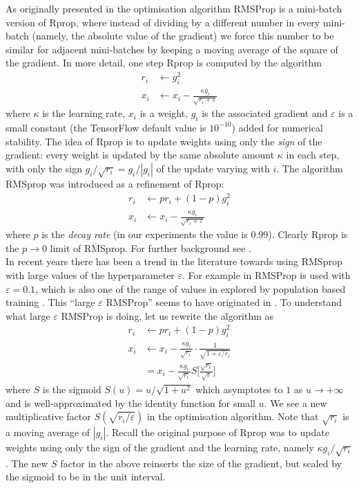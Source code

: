 \documentclass{article} %
\begin{document}
As originally presented in \citep{rmsprop} the optimisation algorithm RMSProp is a mini-batch version of Rprop, where instead of dividing by a different number in every mini-batch (namely, the absolute value of the gradient) we force this number to be similar for adjacent mini-batches by keeping a moving average of the square of the gradient. In more detail, one step Rprop is computed by the algorithm
\begin{align*}
r_i &\leftarrow g_i^2\\
x_i &\leftarrow x_i - \frac{\kappa g_i}{\sqrt{r_i + \varepsilon}}
\end{align*}
where $\kappa$ is the learning rate, $x_i$ is a weight, $g_i$ is the associated gradient and $\varepsilon$ is a small constant (the TensorFlow default value is $10^{-10}$) added for numerical stability. The idea of Rprop is to update weights using only the \emph{sign} of the gradient: every weight is updated by the same absolute amount $\kappa$ in each step, with only the sign $g_i / \sqrt{r_i} = g_i / |g_i|$ of the update varying with $i$. The algorithm RMSprop was introduced as a refinement of Rprop:
\begin{align*}
r_i &\leftarrow p r_i + (1-p) g_i^2\\
x_i &\leftarrow x_i - \frac{\kappa  g_i}{\sqrt{r_i + \varepsilon}}
\end{align*}
where $p$ is the \emph{decay rate} (in our experiments the value is $0.99$). Clearly Rprop is the $p \rightarrow 0$ limit of RMSprop. For further background see \cite[\S 8.5.2]{dlbook}.
\\

In recent years there has been a trend in the literature towards using RMSprop with large values of the hyperparameter $\varepsilon$. For example in  \citep{zambaldi} RMSProp is used with $\varepsilon = 0.1$, which is also one of the range of values in \cite[Table D.1]{impala} explored by population based training \citep{pbt}. This ``large $\varepsilon$ RMSProp'' seems to have originated in \cite[\S 8]{inceptionv3}. To understand what large $\varepsilon$ RMSProp is doing, let us rewrite the algorithm as
\begin{align*}
r_i &\leftarrow p r_i + (1-p) g_i^2\\
x_i &\leftarrow x_i - \frac{\kappa g_i}{\sqrt{r_i}} \cdot \frac{1}{\sqrt{1 + \varepsilon/r_i}}\\
    &= x_i - \frac{\kappa g_i}{\sqrt{r_i}} S\Big[\frac{\sqrt{r_i}}{\sqrt{\varepsilon}}\Big]
\end{align*}
where $S$ is the sigmoid $S(u) = u/\sqrt{1 + u^2}$ which asymptotes to $1$ as $u \rightarrow +\infty$ and is well-approximated by the identity function for small $u$. We see a new multiplicative factor $S(\sqrt{r_i/\varepsilon})$ in the optimisation algorithm. Note that $\sqrt{r_i}$ is a moving average of $|g_i|$. Recall the original purpose of Rprop was to update weights using only the sign of the gradient and the learning rate, namely $\kappa g_i/\sqrt{r_i}$. The new $S$ factor in the above reinserts the size of the gradient, but scaled by the sigmoid to be in the unit interval.
\end{document}
